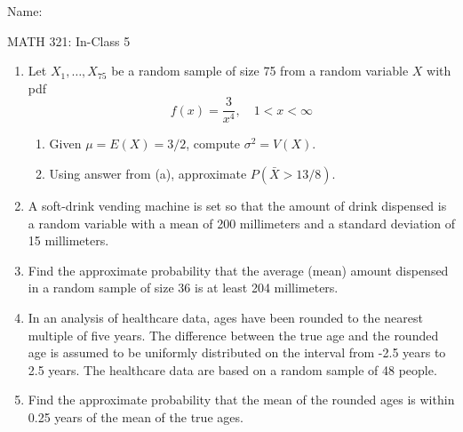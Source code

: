 \documentclass{article}
\newcommand{\vecn}[2]{#1_1, \ldots, #1_{#2}}	%
\begin{document}
\hspace{375pt}Name:

\begin{center}
{\Huge MATH 321: In-Class 5}
\end{center}

\bigskip\bigskip


\begin{enumerate}

    \item Let $\vecn{X}{75}$ be a random sample of size 75 from a random variable $X$ with pdf 
    \[f(x) = \frac{3}{x^4}, \quad 1< x < \infty\]%
    \begin{enumerate}
        \item Given $\mu = E(X) = 3/2$, compute $\sigma^2 = V(X)$.\vspace{100pt}
        \item Using answer from (a), approximate $P(\bar{X} > 13/8)$.\vspace{100pt}
    \end{enumerate}
    
    \item A soft-drink vending machine is set so that the amount of drink dispensed is a random variable with a mean of 200 millimeters and a standard deviation of 15 millimeters.
    \item[] Find the approximate probability that the average (mean) amount dispensed in a random sample of size 36 is at least 204 millimeters.\vspace{100pt}%
    
    \item In an analysis of healthcare data, ages have been rounded to the nearest multiple of five years. The difference between the true age and the rounded age is assumed to be uniformly distributed on the interval from -2.5 years to 2.5 years. The healthcare data are based on a random sample of 48 people.
    \item[] Find the approximate probability that the mean of the rounded ages is within 0.25 years of the mean of the true ages.\vspace{100pt}\newpage%
    

\end{enumerate}
\end{document}
